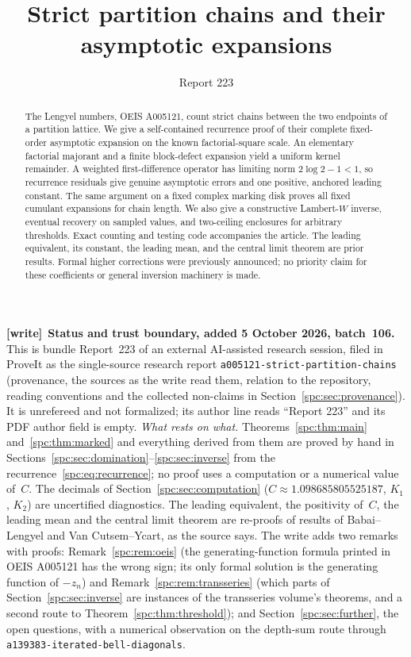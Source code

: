 \documentclass[11pt,letterpaper]{article}
\title{Strict partition chains and their asymptotic expansions}
\author{Report 223}
\date{}
\theoremstyle{definition}\newtheorem{definition}[theorem]{Definition}
\theoremstyle{remark}\newtheorem{remark}[theorem]{Remark}
\newcommand{\file}[1]{\nolinkurl{#1}}
\newenvironment{writenote}[1][]{\par\smallskip\begingroup\small
 \noindent\textbf{[write]}\if\relax\detokenize{#1}\relax\else~\textbf{#1.}\fi\ }%
 {\par\endgroup\smallskip}
\begin{document}
\maketitle
\begin{abstract}
The Lengyel numbers, OEIS A005121, count strict chains between the two endpoints of a partition lattice. We give a self-contained recurrence proof of their complete fixed-order asymptotic expansion on the known factorial-square scale. An elementary factorial majorant and a finite block-defect expansion yield a uniform kernel remainder. A weighted first-difference operator has limiting norm $2\log 2-1<1$, so recurrence residuals give genuine asymptotic errors and one positive, anchored leading constant. The same argument on a fixed complex marking disk proves all fixed cumulant expansions for chain length. We also give a constructive Lambert-$W$ inverse, eventual recovery on sampled values, and two-ceiling enclosures for arbitrary thresholds. Exact counting and testing code accompanies the article. The leading equivalent, its constant, the leading mean, and the central limit theorem are prior results. Formal higher corrections were previously announced; no priority claim for these coefficients or general inversion machinery is made.
\end{abstract}

\begin{writenote}[Status and trust boundary, added 5 October 2026, batch~106]
This is bundle Report~223 of an external AI-assisted research session,
filed in ProveIt as the single-source research report
\file{a005121-strict-partition-chains} (provenance, the sources as the write
read them, relation to the repository, reading conventions and the collected
non-claims in Section~\ref{spc:sec:provenance}). It is unrefereed and not
formalized; its author line reads ``Report 223'' and its PDF author field is
empty. \emph{What rests on what.} Theorems~\ref{spc:thm:main}
and~\ref{spc:thm:marked} and everything derived from them are proved by hand
in Sections~\ref{spc:sec:domination}--\ref{spc:sec:inverse} from the
recurrence~\eqref{spc:eq:recurrence}; no proof uses a computation or a
numerical value of~$C$. The decimals of Section~\ref{spc:sec:computation}
($C\approx1.098685805525187$, $K_1$, $K_2$) are uncertified diagnostics. The
leading equivalent, the positivity of~$C$, the leading mean and the central
limit theorem are re-proofs of results of Babai--Lengyel and Van
Cutsem--Ycart, as the source says. The write adds two remarks with proofs:
Remark~\ref{spc:rem:oeis} (the generating-function formula printed in OEIS
A005121 has the wrong sign; its only formal solution is the generating
function of $-z_n$) and Remark~\ref{spc:rem:transseries} (which parts of
Section~\ref{spc:sec:inverse} are instances of the transseries volume's
theorems, and a second route to Theorem~\ref{spc:thm:threshold}); and
Section~\ref{spc:sec:further}, the open questions, with a numerical
observation on the depth-sum route through
\file{a139383-iterated-bell-diagonals}.
\end{writenote}
\tableofcontents
\end{document}
